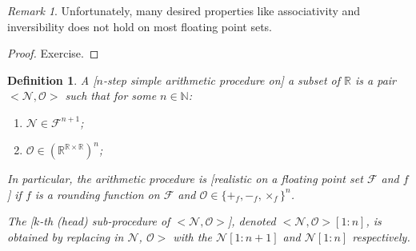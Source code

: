 \documentclass{book}
\newtheorem{definition}{Definition}
\theoremstyle{definition}\newtheorem{mechanism}{Mechanism}
\theoremstyle{remark}\newtheorem*{remark}{Remark}
\begin{document}
\begin{remark}
	Unfortunately, many desired properties like associativity and inversibility does not hold on most floating point sets.
\end{remark}

\begin{proof}
	Exercise.
\end{proof}

\begin{definition}
	A [$n$-step simple arithmetic procedure on] a subset of $\mathbb R$ is a pair $<\mathcal N, \mathcal O>$ such that for some $n\in \mathbb N$:
	
	\begin{enumerate}
		\item $\mathcal N \in \mathcal F^{n + 1}$;
		\item $\mathcal O \in (\mathbb R^{\mathbb{R} \times \mathbb{R}})^{n}$;
	\end{enumerate}
	
	In particular, the arithmetic procedure is [realistic on a floating point set $\mathcal F$ and $f$] if $f$ is a rounding function on $\mathcal F$ and $\mathcal O \in \{+_f, -_f, \times_f\}^n$.
	
	The [$k$-th (head) sub-procedure of $<\mathcal N, \mathcal O>$], denoted $<\mathcal N, \mathcal O>[1:n]$, is obtained by replacing in $\mathcal N$, $\mathcal O>$ with the $\mathcal N[1:n + 1]$ and $\mathcal N[1:n]$ respectively.
\end{definition}	
\end{document}
